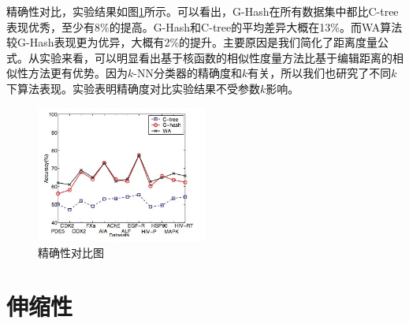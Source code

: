\documentclass{article}
\begin{document}
精确性对比，实验结果如图\ref{fg:ac}所示。可以看出，G-Hash在所有数据集中都比C-tree表现优秀，至少有8\%的提高。G-Hash和C-tree的平均差异大概在13\%。而WA算法较G-Hash表现更为优异，大概有2\%的提升。主要原因是我们简化了距离度量公式。从实验来看，可以明显看出基于核函数的相似性度量方法比基于编辑距离的相似性方法更有优势。因为$k$-NN分类器的精确度和$k$有关，所以我们也研究了不同$k$下算法表现。实验表明精确度对比实验结果不受参数$k$影响。
\begin{figure}[htb]
    \centering
    \includegraphics[width=0.5\textwidth]{ac}
    \caption{精确性对比图}
    \label{fg:ac}
\end{figure}
\section{伸缩性}
\end{document}
